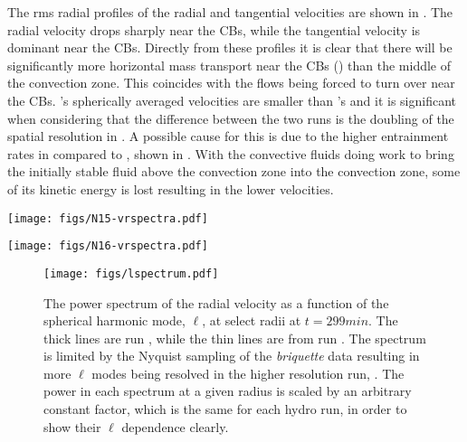 \documentclass[fleqn,usenatbib]{mnras}
\newcommand{\cldfluid}{fluid above the convection zone}
\begin{document}
The rms radial profiles of the radial and tangential velocities are shown in
. The radial velocity drops sharply near the CBs, while the
tangential velocity is dominant near the CBs. Directly from these profiles it
is clear that there will be significantly more horizontal mass transport near
the CBs () than the middle of the convection zone. This
coincides with the flows being forced to turn over near the CBs. 's
spherically averaged velocities are smaller than 's and it is
significant when considering that the difference between the two runs is the
doubling of the spatial resolution in . A possible cause for this is
due to the higher entrainment rates in  compared to , shown
in . With the convective fluids doing work to bring the initially
stable \cldfluid{} into the convection zone, some of its kinetic energy is
lost resulting in the lower velocities.

\begin{figure*}

  \begin{minipage}{.49\textwidth}
    \centering
    \texttt{[image: figs/N15-vrspectra.pdf]}
  \end{minipage}
  \begin{minipage}{.49\textwidth}
    \centering
    \texttt{[image: figs/N16-vrspectra.pdf]}
  \end{minipage}
  \caption{The power spectrum, in terms of the spherical harmonic modes, $\ell$,
          of the radial velocity as a function of radius at $t = \unit{299}{min}$ within
          the convection zone. The left panel is from run , while the right panel
          is from run . The power in each radial bin is normalized by the
          maximum power within that radial bin.}
  \label{fig:power-spectrum}

\end{figure*}

\begin{figure}

  \texttt{[image: figs/lspectrum.pdf]}
  \centering
  \caption{The power spectrum of the radial velocity as a function of the spherical harmonic mode,
          $\ell$, at select radii at $t = \unit{299}{min}$. The
          thick lines are run , while the thin lines are from run . The
          spectrum is limited by the Nyquist sampling of the \textit{briquette} data
          resulting in more $\ell$ modes being resolved in the higher resolution run,
          . The power in each spectrum at a given radius is scaled by an
          arbitrary constant factor, which is the same for each hydro run, in
          order to show their $\ell$ dependence clearly.}
  \label{fig:lspectrum}

\end{figure}
\end{document}

